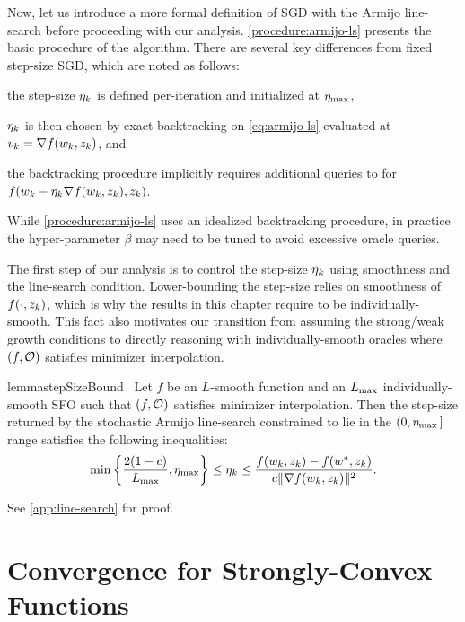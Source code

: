 Now, let us introduce a more formal definition of \ac{SGD} with the Armijo line-search before proceeding with our analysis.
\autoref{procedure:armijo-ls} presents the basic procedure of the algorithm.
There are several key differences from fixed step-size \ac{SGD}, which are noted as follows:
\begin{inparaenum}[(i)]
    \item the step-size \( \etak \) is defined per-iteration and initialized at \( \etamax \),
    \item \( \etak \) is then chosen by exact backtracking on \autoref{eq:armijo-ls} evaluated at \( v_k = \grad(\wk, \zk) \), and
    \item the backtracking procedure implicitly requires additional queries to \oracle{} for \( f(\wk - \etak \grad(\wk, \zk), \zk) \).
\end{inparaenum}
While \autoref{procedure:armijo-ls} uses an idealized backtracking procedure, in practice the hyper-parameter \( \beta \) may need to be tuned to avoid excessive oracle queries. 


The first step of our analysis is to control the step-size \( \etak \) using smoothness and the line-search condition.
Lower-bounding the step-size relies on smoothness of \( f(\cdot, \zk) \), which is why the results in this chapter require \oracle{} to be individually-smooth. 
This fact also motivates our transition from assuming the strong/weak growth conditions to directly reasoning with individually-smooth oracles where \( \rbr{f, \oracle{}} \) satisfies minimizer interpolation.
\begin{restatable}{lemma}{stepSizeBound}~\label{lemma:step-size-bound}
    Let \( f \) be an \( L \)-smooth function and \oracle{} an \( \Lmax \) individually-smooth \ac{SFO} such that \( \rbr{f, \oracle{}} \) satisfies minimizer interpolation. 
    Then the step-size returned by the stochastic Armijo line-search constrained to lie in the \( (0, \etamax \, ] \) range satisfies the following inequalities:
    \[ \min\cbr{\frac{2 (1-c)}{\Lmax}, \etamax} \leq \etak \leq \frac{f(\wk, \zk) - f(\wopt, \zk)}{c \norm{\grad(\wk, \zk)}^2}. \]
\end{restatable}
\noindent See \autoref{app:line-search} for proof.

\section{Convergence for Strongly-Convex Functions}~\label{sec:ls-sc}

